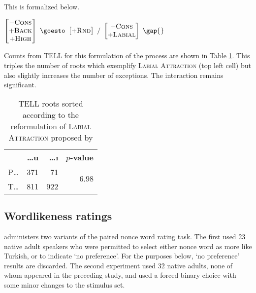 \noindent
This is formalized below.

\begin{example}
$\begin{bmatrix} -\textsc{Cons} \\ +\textsc{Back} \\ +\textsc{High} \end{bmatrix}~\goesto~\begin{bmatrix} +\textsc{Rnd} \end{bmatrix}~/~\begin{bmatrix} +\textsc{Cons} \\ +\textsc{Labial} \end{bmatrix}~\gap{}$
\end{example}

Counts from TELL for this formulation of the process are shown in Table \ref{lasi}. This triples the number of roots which exemplify \textsc{Labial Attraction} (top left cell) but also slightly increases the number of exceptions. The interaction remains significant.

\begin{table}
\centering
\begin{tabular}{lrrr}
\toprule
       & \ldots{}u  & \ldots{}ı & $p$-value                      \\
\midrule
P\ldots{}  & 371    & 71        & \multirow{2}{*}{$6.98$\e{-49}} \\
T\ldots{}  & 811    & 922       &                                \\
\bottomrule
\end{tabular}
\caption{TELL roots sorted according to the reformulation of \textsc{Labial Attraction} proposed by \citet{Inkelas2001}}
\label{lasi}
\end{table}

\subsection{Wordlikeness ratings}

\citet{Zimmer1969} administers two variants of the paired nonce word rating task. The first used 23 native adult speakers who were permitted to select either nonce word as more like Turkish, or to indicate `no preference'. For the purposes below, `no preference' results are discarded. The second experiment used 32 native adults, none of whom appeared in the preceding study, and used a forced binary choice with some minor changes to the stimulus set. 

